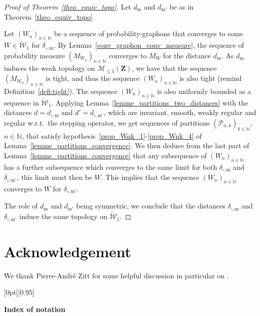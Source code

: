 \documentclass{amsart}
\newcommand{\cuthere}{%
\noindent
\raisebox{-2.8pt}[0pt][0.95\baselineskip]{\ding{34}}
\unskip{\tiny\dotfill}
}
\newcommand{\wrt}{w.r.t.\ }
\theoremstyle{plain}
\theoremstyle{definition}
\newcommand{\Space}{\mathbf{Z}}
\newcommand{\cP}{\mathcal{P}}
\newcommand{\SubProba}{\mathcal{M}_{\leq1}(\Space)}
\newcommand{\UGraphon}{\widetilde{\mathcal{W}}_1}
\newcommand{\m}{\mathrm{m}}
\newcommand{\dmeas}{d_\m}
\newcommand{\dcut}{d_{\square,\m}}
\newcommand{\ddcut}{\delta_{\square,\m}}
\newcommand{\mPrime}{\mathrm{m'}}
\newcommand{\dmeasPrime}{d_{\mPrime}}
\newcommand{\dcutPrime}{d_{\square,\mPrime}}
\newcommand{\dPrime}{d'}
\newcommand{\ddcutPrime}{\delta_{\square,\mPrime}}
\newcommand{\N}{\mathbb{N}}
\begin{document}
\begin{proof}[Proof of Theorem~\ref{theo_equiv_topo}]
Let $\dmeas$ and $\dmeasPrime$ be as in  Theorem~\ref{theo_equiv_topo}. 

Let  $(W_n )_{n\in\N}$ be  a  sequence of  probability-graphons  that
converges     to    some     $W\in\UGraphon$    for     $\ddcut$.     
By Lemma~\ref{conv_graphon_conv_measure},  
the sequence of probability measure $(M_{W_n})_{n\in\N}$ 
converges to $M_W$ for the distance $\dmeas$.
As $\dmeas$ induces the weak topology on $\SubProba$,
we  have  that the  sequence $(M_{W_n})_{n\in\N}$ is tight,
and thus the sequence $(W_n )_{n\in\N}$ is also tight
	(remind Definition~\ref{defi:tight}).
The sequence $(W_n )_{n\in\N}$ is  also uniformly  bounded  as a  sequence in  $\UGraphon$.
Applying  Lemma~\ref{lemme_partitions_two_distances} with  the distances $d=\dcut$ and
$\dPrime=\dcutPrime$,  which are invariant, smooth, weakly regular and regular \wrt the stepping operator,
we              get      sequences of partitions $(\cP_{n,k})_{k\in\N}$, $n\in\N$,        that
satisfy hypothesis~\ref{prop_Wnk_1}-\ref{prop_Wnk_4}                         of
Lemma~\ref{lemme_partitions_convergence}. 
We  then deduce
from the last part  of Lemma~\ref{lemme_partitions_convergence} that any
subsequence of  $(W_n)_{n\in\N}$ has  a further  subsequence  
which   converges    to the same limit for both $\ddcut$ and $\ddcutPrime$,
	this limit must then be $W$.
This implies  that the sequence $(W_n )_{n\in\N}$ converges  to $W$ for
$\ddcutPrime$.

The role of $\dmeas$ and $\dmeasPrime$ being symmetric,
we conclude that the distances $\ddcut$ and $\ddcutPrime$
induce the same topology on $\UGraphon$.
\end{proof}


\section*{Acknowledgement}

We thank Pierre-André Zitt for some helpful discussion 
in particular on  .



\cuthere \medskip
\begin{center}
 \textbf{Index of notation}
\end{center}
\vspace{1em}
\end{document}
